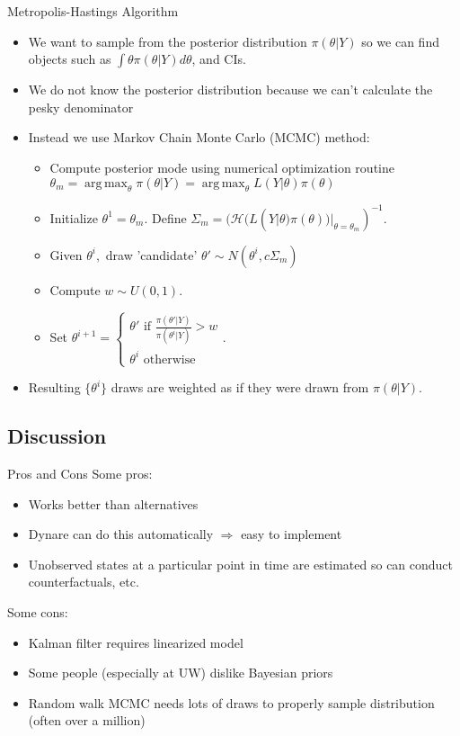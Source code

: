 \documentclass{beamer}
\DeclareMathOperator*{\argmax}{arg\,max}
\begin{document}
\begin{frame}{Metropolis-Hastings Algorithm}
\begin{itemize}
\item We want to sample from the posterior distribution $\pi(\theta|Y)$ so we can find objects such as $\int \theta \pi(\theta|Y) d\theta$, and CIs.
\item We do not know the posterior distribution because we can't calculate the pesky denominator
\item Instead we  use Markov Chain Monte Carlo (MCMC) method:
\begin{itemize}
\item Compute posterior mode using numerical optimization routine $\theta_{m} = \argmax_{\theta} \pi(\theta|Y) =  \argmax_{\theta} L(Y|\theta)\pi(\theta) $
\item Initialize $\theta^{1} = \theta_{m}$. Define $\Sigma_{m} = (\mathcal{H}( L(Y|\theta)\pi(\theta))|_{\theta = \theta_{m}})^{-1}$.
\item Given $\theta^i,$ draw 'candidate' $\theta ' \sim N(\theta^i,c\Sigma_m)$
\item Compute $w \sim U(0,1).$
\item Set $\theta^{i+1} = \begin{cases} \theta' \text{ if } \frac{\pi(\theta'|Y)}{\pi(\theta^i|Y)} > w \\ \theta^i \text{ otherwise} \end{cases}$.
\end{itemize}
\item Resulting $\{\theta^i \}$ draws are weighted as if they were drawn from $\pi(\theta|Y)$.
\end{itemize}
\end{frame}

\subsection{Discussion}

\begin{frame}{Pros and Cons}
Some pros:
\begin{itemize}
\item Works better than alternatives
\item Dynare can do this automatically $\Rightarrow$ easy to implement
\item Unobserved states at a particular point in time are estimated so can conduct counterfactuals, etc.
\end{itemize}

Some cons:
\begin{itemize}
\item Kalman filter requires linearized model
\item Some people (especially at UW) dislike Bayesian priors
\item Random walk MCMC needs lots of draws to properly sample distribution (often over a million)
\end{itemize}
\end{frame}
\end{document}

